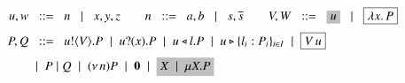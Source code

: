	\begin{figure}[t]
		\begin{align*}
			u,w  & \bnfis n \bnfbar x,y,z 
			\qquad
			n  \bnfis a,b \bnfbar s, \dual{s} 
			\qquad
			V,W  \bnfis \nonhosyntax{u} \bnfbar \nonpisyntax{\abs{x}{P}}
			\\[1mm]
			P,Q
			 & \bnfis 
			\bout{u}{V}{P}  \sbnfbar  \binp{u}{x}{P} \sbnfbar
			\bsel{u}{l} P \sbnfbar \bbra{u}{l_i:P_i}_{i \in I} \sbnfbar \nonpisyntax{\appl{V}{u}}
			\\[1mm]
			 & \sbnfbar P\Par Q \sbnfbar \news{n} P 
			\sbnfbar \inact \sbnfbar \nonhosyntax{\rvar{X} \sbnfbar \recp{X}{P}}
		\end{align*}
	\caption{}
	\label{fig:syntax}
\end{figure}

